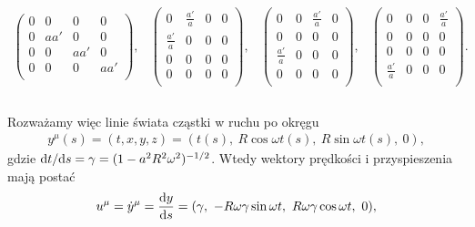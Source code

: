 $$
\begin{array}{cccc}
\left(
    \begin{array}{cccc}
    0 & 0 & 0 & 0 \\
    0 & a a' & 0 & 0 \\
    0 & 0 & a a' & 0 \\
    0 & 0 & 0 & a a' \\
    \end{array}
    \right), &
    \left(
    \begin{array}{cccc}
    0 & \frac{a'}{a} & 0 & 0 \\
    \frac{a'}{a} & 0 & 0 & 0 \\
    0 & 0 & 0 & 0 \\
    0 & 0 & 0 & 0 \\
    \end{array}
    \right), &
    \left(
    \begin{array}{cccc}
    0 & 0 & \frac{a'}{a} & 0 \\
    0 & 0 & 0 & 0 \\
    \frac{a'}{a} & 0 & 0 & 0 \\
    0 & 0 & 0 & 0 \\
    \end{array}
    \right), &
    \left(
    \begin{array}{cccc}
    0 & 0 & 0 & \frac{a'}{a} \\
    0 & 0 & 0 & 0 \\
    0 & 0 & 0 & 0 \\
    \frac{a'}{a} & 0 & 0 & 0 \\
    \end{array}
    \right). \\
\end{array}
 $$ 
 \\
Rozważamy więc linie świata cząstki w ruchu po okręgu 
\begin{align}\nonumber
y^\mu(s) = (t,x,y,z)= (t(s),\ R\cos\omega t(s),\ R\sin\omega t(s),\ 0),
\end{align}  
gdzie $\text{d} t/\text{d} s=\gamma= (1-a^2R^2\omega^2)^{-1/2}$.
Wtedy wektory prędkości i przyspieszenia mają postać 
\begin{align}\nonumber
u^\mu = \dot{y}^\mu = \frac{\text{d} y}{\text{d} s} = 
(\gamma,\ -R\omega\gamma\sin\omega t,
\ R\omega\gamma\cos\omega t,\ 0),
\end{align}
